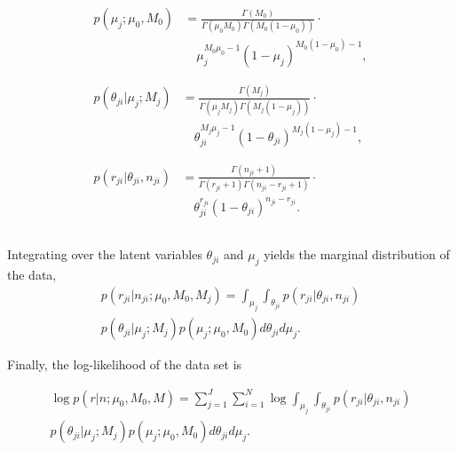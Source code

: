 \documentclass{bioinfo}
\begin{document}
\begin{align}
  \begin{split}
  p\left( \mu_j; \mu_0, M_0 \right)  &= \frac{ \Gamma(M_0) } { \Gamma(\mu_0 M_0) \Gamma(M_0 (1-\mu_0)) } \cdot \\
  &\quad \mu_j^{M_0\mu_0 -1} (1 - \mu_j)^{M_0 ( 1 - \mu_0) - 1}, \nonumber \\
  \end{split}\\
  \begin{split}
  p\left( \theta_{ji} | \mu_j; M_j \right) &= \frac{ \Gamma(M_j) } { \Gamma(\mu_j M_j) \Gamma(M_j (1-\mu_j)) } \cdot \\
  &\quad \theta_{ji}^{M_j\mu_j -1} (1 - \theta_{ji})^{M_j ( 1 - \mu_j) - 1}, \nonumber \\
  \end{split}\\
  \begin{split}
  p\left( r_{ji} | \theta_{ji}, n_{ji} \right) &= \frac{ \Gamma(n_{ji}+1) } { \Gamma(r_{ji}+1) \Gamma( n_{ji} - r_{ji} + 1 ) } \cdot \\
  &\quad \theta_{ji}^{r_{ji}} (1 - \theta_{ji})^{n_{ji} - r_{ji}}. \nonumber\\
  \end{split}\\
\end{align}


Integrating over the latent variables $\theta_{ji}$ and $\mu_j$ yields the marginal distribution of the data,
\begin{multline}
p \left( r_{ji} | n_{ji} ; \mu_0, M_0, M_j \right) = \int_{\mu_j} \int_{\theta_{ji}}  p \left( r_{ji} | \theta_{ji}, n_{ji} \right) \\ p\left( \theta_{ji} | \mu_j; M_j \right) p\left( \mu_j; \mu_0, M_0 \right) d\theta_{ji} d\mu_j.
\end{multline}

Finally, the log-likelihood of the data set is

\begin{multline}
\log p \left( r | n ; \mu_0, M_0, M \right) = \sum_{j=1}^J \sum_{i=1}^N \log \int_{\mu_j} \int_{\theta_{ji}}  p \left( r_{ji} | \theta_{ji}, n_{ji} \right) \\ p\left( \theta_{ji} | \mu_j; M_j \right) p\left( \mu_j; \mu_0, M_0 \right) d\theta_{ji} d\mu_j.
\end{multline}


\end{document}
